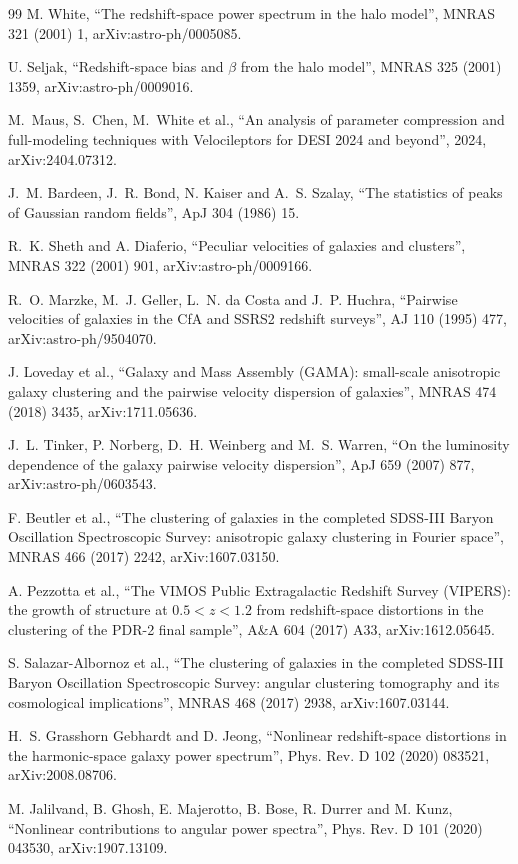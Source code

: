 \documentclass[11pt]{article}
\begin{document}
\begin{thebibliography}{99}
M. White,
``The redshift-space power spectrum in the halo model'',
MNRAS 321 (2001) 1, arXiv:astro-ph/0005085.

U. Seljak,
``Redshift-space bias and $\beta$ from the halo model'',
MNRAS 325 (2001) 1359, arXiv:astro-ph/0009016.

M.~Maus, S.~Chen, M.~White et al.,
``An analysis of parameter compression and full-modeling techniques
with Velocileptors for DESI 2024 and beyond'',
2024, arXiv:2404.07312.

J.~M. Bardeen, J.~R. Bond, N. Kaiser and A.~S. Szalay,
``The statistics of peaks of Gaussian random fields'',
ApJ 304 (1986) 15.

R.~K. Sheth and A. Diaferio,
``Peculiar velocities of galaxies and clusters'',
MNRAS 322 (2001) 901, arXiv:astro-ph/0009166.

R.~O. Marzke, M.~J. Geller, L.~N. da Costa and J.~P. Huchra,
``Pairwise velocities of galaxies in the CfA and SSRS2 redshift
surveys'',
AJ 110 (1995) 477, arXiv:astro-ph/9504070.

J. Loveday et al.,
``Galaxy and Mass Assembly (GAMA): small-scale anisotropic galaxy
clustering and the pairwise velocity dispersion of galaxies'',
MNRAS 474 (2018) 3435, arXiv:1711.05636.

J.~L. Tinker, P. Norberg, D.~H. Weinberg and M.~S. Warren,
``On the luminosity dependence of the galaxy pairwise velocity
dispersion'',
ApJ 659 (2007) 877, arXiv:astro-ph/0603543.

F. Beutler et al.,
``The clustering of galaxies in the completed SDSS-III Baryon
Oscillation Spectroscopic Survey: anisotropic galaxy clustering in
Fourier space'',
MNRAS 466 (2017) 2242, arXiv:1607.03150.

A. Pezzotta et al.,
``The VIMOS Public Extragalactic Redshift Survey (VIPERS): the growth
of structure at $0.5 < z < 1.2$ from redshift-space distortions in
the clustering of the PDR-2 final sample'',
A\&A 604 (2017) A33, arXiv:1612.05645.

S. Salazar-Albornoz et al.,
``The clustering of galaxies in the completed SDSS-III Baryon
Oscillation Spectroscopic Survey: angular clustering tomography and
its cosmological implications'',
MNRAS 468 (2017) 2938, arXiv:1607.03144.

H.~S. Grasshorn Gebhardt and D. Jeong,
``Nonlinear redshift-space distortions in the harmonic-space galaxy
power spectrum'',
Phys. Rev. D 102 (2020) 083521, arXiv:2008.08706.

M. Jalilvand, B. Ghosh, E. Majerotto, B. Bose, R. Durrer and M. Kunz,
``Nonlinear contributions to angular power spectra'',
Phys. Rev. D 101 (2020) 043530, arXiv:1907.13109.

\end{thebibliography}
\end{document}
